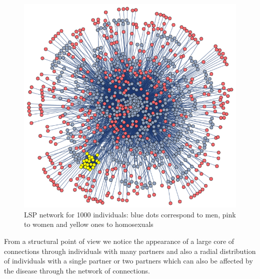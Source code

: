 \begin{figure}[ht]
	\centering
	\includegraphics{IMG/LSP.png}
	\caption{LSP network for 1000 individuals: blue dots correspond to men, pink to women and yellow ones to homosexuals}
	\label{LSPNET}
\end{figure}

From a structural point of view we notice the appearance of a large core of connections through individuals with many partners and also a radial distribution of individuals with a single partner or two partners which can also be affected by the disease through the network of connections.
